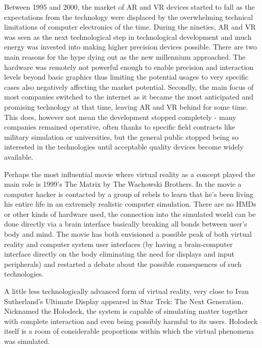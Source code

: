 \documentclass[12pt, a4paper]{article}
\begin{document}
Between 1995 and 2000, the market of AR and VR devices started to fall as the expectations from the technology were displaced by the overwhelming technical limitations of computer electronics of the time. During the nineties, AR and VR was seen as the next technological step in technological development and much energy was invested into making higher precision devices possible. There are two main reasons for the hype dying out as the new millennium approached. The hardware was remotely not powerful enough to enable precision and interaction levels beyond basic graphics thus limiting the potential usages to very specific cases also negatively affecting the market potential. Secondly, the main focus of most companies switched to the internet as it became the most anticipated and promising technology at that time, leaving AR and VR behind for some time. This does, however not mean the development stopped completely - many companies remained operative, often thanks to specific field contracts like military simulation or universities, but the general public stopped being so interested in the technologies until acceptable quality devices become widely available.

Perhaps the most influential movie where virtual reality as a concept played the main role is 1999’s The Matrix by The Wachowski Brothers. In the movie a computer hacker is contacted by a group of rebels to learn that he’s been living his entire life in an extremely realistic computer simulation. There are no HMDs or other kinds of hardware used, the connection into the simulated world can be done directly via a brain interface basically breaking all bonds between user’s body and mind. The movie has both envisioned a possible peak of both virtual reality and computer system user interfaces (by having a brain-computer interface directly on the body eliminating the need for displays and input peripherals) and restarted a debate about the possible consequences of such technologies.

A little less technologically advanced form of virtual reality, very close to Ivan Sutherland’s Ultimate Display appeared in Star Trek: The Next Generation. Nicknamed the Holodeck, the system is capable of simulating matter together with complete interaction and even being possibly harmful to its users. Holodeck itself is a room of considerable proportions within which the virtual phenomena was simulated.

\end{document}
